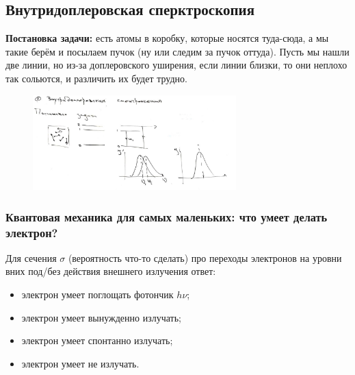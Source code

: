 \subsection*{Внутридоплеровская сперктроскопия}
\textbf{Постановка задачи:} есть атомы в коробку, которые носятся туда-сюда, а мы такие берём и посылаем пучок (ну или следим за пучок оттуда). Пусть мы нашли две линии, но из-за доплеровского уширения, если линии близки, то они неплохо так сольются, и различить их будет трудно.
\begin{figure}[ht]
    \centering
    \includegraphics[width=0.7\textwidth]{img/lec_6.png}
\end{figure}

\subsubsection*{Квантовая механика для самых маленьких: что умеет делать электрон?}
Для сечения $\sigma$ (вероятность что-то сделать) про переходы электронов на уровни вних под/без действия внешнего излучения ответ:
\begin{itemize}
	\item электрон умеет поглощать фотончик $h \nu$;
	\item электрон умеет вынужденно излучать;
	\item электрон умеет спонтанно излучать;
	\item электрон умеет не излучать.
\end{itemize}
 
